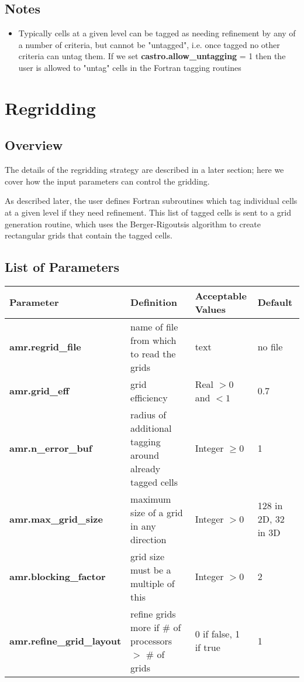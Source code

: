 \subsection{Notes}

\begin{itemize}
\item Typically cells at a given level can be tagged as needing refinement by any of a number
of criteria, but cannot be "untagged", i.e. once tagged no other criteria can untag them.   If
we set {\bf castro.allow\_untagging} = 1 then the user is allowed to "untag" cells in the
Fortran tagging routines
\end{itemize}

\section{Regridding}
\subsection{Overview}

The details of the regridding strategy are described in a later section; here we 
cover how the input parameters can control the gridding.

As described later, the user defines Fortran subroutines which tag individual
cells at a given level if they need refinement.  This list of tagged cells is
sent to a grid generation routine, which uses the Berger-Rigoutsis algorithm
to create rectangular grids that contain the tagged cells.   

\subsection{List of Parameters}

\begin{table*}[h]
\begin{scriptsize}
\begin{center}
\begin{tabular}{|l|l|l|l|} \hline
Parameter & Definition & Acceptable Values &Default\\
\hline
{\bf amr.regrid\_file} & name of file from which to read the grids & text & no file  \\ 
{\bf amr.grid\_eff} & grid efficiency & Real $>0$ and $<1$ & 0.7 \\ 
{\bf amr.n\_error\_buf} & radius of additional tagging around already tagged cells & Integer $\geq 0$ & 1 \\ 
{\bf amr.max\_grid\_size} & maximum size of a grid in any direction & Integer $> 0$ & 128 in 2D, 32 in 3D \\ 
{\bf amr.blocking\_factor} &  grid size must be a multiple of this & Integer $> 0$ & 2\\
{\bf amr.refine\_grid\_layout} & refine grids more if \# of processors $>$ \# of grids &  0 if false, 1 if true & 1 \\
\hline
\end{tabular}
\label{Table:GriddingInputs}
\end{center}
\end{scriptsize}
\end{table*}

